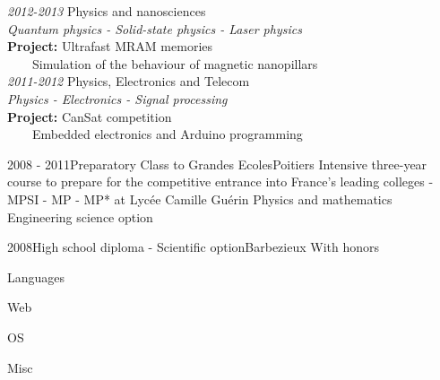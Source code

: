 \documentclass[a4paper]{genard-cv}
\begin{document}
\begin{body}
\begin{entry}
			\textit{2012-2013} Physics and nanosciences\\
			\textit{Quantum physics - Solid-state physics - Laser physics}\\
			\textbf{Project:} Ultrafast MRAM memories\\
			~~~~Simulation of the behaviour of magnetic nanopillars
			\medskip\\

			\textit{2011-2012} Physics, Electronics and Telecom\\
			\textit{Physics - Electronics - Signal processing}\\
			\textbf{Project:} CanSat competition\\
			~~~~Embedded electronics and Arduino programming
		\end{entry}
		\begin{entry}
			{2008 - 2011}{Preparatory Class to Grandes Ecoles}{Poitiers}
			{Intensive three-year course to prepare for the competitive entrance
			into France’s leading colleges - MPSI - MP - MP* at Lycée Camille Guérin}
			Physics and mathematics\\
			Engineering science option
		\end{entry}
		\begin{entry}
			{2008}{High school diploma - Scientific option}{Barbezieux}
			{With honors}
		\end{entry}

\end{body}

\begin{aside}

	\begin{about}
	\end{about}\noindent

	\skills
	
	\begin{skillgroup}{Languages}
	\end{skillgroup}

	\begin{skillgroup}{Web}
	\end{skillgroup}

	\begin{skillgroup}{OS}
	\end{skillgroup}

	\begin{skillgroup}{Misc}
	\end{skillgroup}

	\skillscaption
\end{aside}
\end{document}
